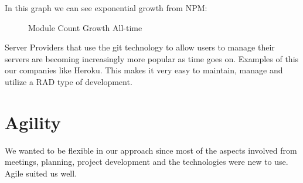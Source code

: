 \pagebreak
In this graph we can see exponential growth from NPM:
\begin{figure}[H] 
	\caption{Module Count Growth All-time }
	\label{fig:speciation}
\end{figure}

Server Providers that use the git \cite{git} technology to allow users to manage their servers are becoming increasingly more popular as time goes on.
Examples of this our companies like Heroku.
This makes it very easy to maintain, manage and utilize a RAD type of development.

\section{Agility}
We wanted to be flexible in our approach since most of the aspects involved from meetings, planning, project development and the technologies were new to use. Agile suited us well.

